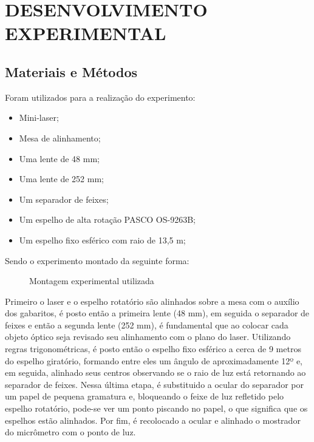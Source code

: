 \section{DESENVOLVIMENTO EXPERIMENTAL}
\subsection{Materiais e Métodos}
Foram utilizados para a realização do experimento:
\begin{itemize}
	\item Mini-laser;
	\item Mesa de alinhamento;
	\item Uma lente de 48 mm;
	\item Uma lente de 252 mm;
	\item Um separador de feixes;
	\item Um espelho de alta rotação PASCO OS-9263B;
	\item Um espelho fixo esférico com raio de 13,5 m;
\end{itemize}
Sendo o experimento montado da seguinte forma:
\begin{figure}[h!]
	\centering
	\caption{Montagem experimental utilizada}
\end{figure}


Primeiro o laser e o espelho rotatório são alinhados sobre a mesa com o auxílio dos gabaritos, é posto então a primeira lente (48 mm), em seguida o separador de feixes e então a segunda lente (252 mm), é fundamental que ao colocar cada objeto óptico seja revisado seu alinhamento com o plano do laser. Utilizando regras trigonométricas, é posto então o espelho fixo esférico a cerca de 9 metros
do espelho giratório, formando entre eles um ângulo de aproximadamente 12º e, em seguida, alinhado seus centros observando  se o raio de luz está retornando ao separador de feixes. Nessa última etapa, é substituido a ocular do separador por um papel de pequena gramatura e, bloqueando o feixe de luz refletido pelo espelho rotatório, pode-se ver um ponto piscando no papel, o que significa que os espelhos estão alinhados. Por fim, é recolocado a ocular e alinhado o mostrador do micrômetro com o ponto de luz.
